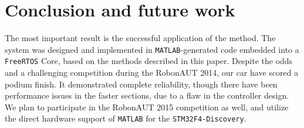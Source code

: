 \section{Conclusion and future work}

The most important result is the successful application of the method. The system was designed and implemented in \verb!MATLAB!-generated code embedded into a \verb!FreeRTOS! Core, based on the methods described in this paper. Despite the odds and a challenging competition during the RobonAUT 2014, our car have scored a podium finish. It demonstrated complete reliability, though there have been performance issues in the faster sections, due to a flaw in the controller design. We plan to participate in the RobonAUT 2015 competition as well, and utilize the direct hardware support of \verb!MATLAB! for the \texttt{STM32F4-Discovery}.
